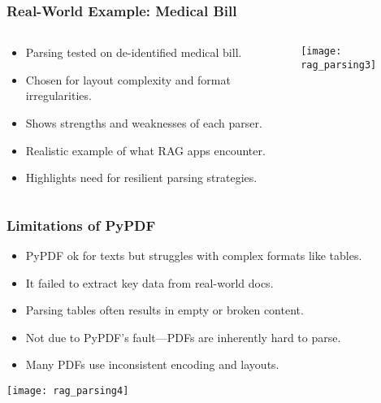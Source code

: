 \begin{frame}[fragile]\frametitle{Real-World Example: Medical Bill}
\begin{columns}
  \begin{column}[T]{0.6\linewidth}
    \begin{itemize}
      \item Parsing tested on de-identified medical bill.
      \item Chosen for layout complexity and format irregularities.
      \item Shows strengths and weaknesses of each parser.
      \item Realistic example of what RAG apps encounter.
      \item Highlights need for resilient parsing strategies.
    \end{itemize}
  \end{column}
  \begin{column}[T]{0.4\linewidth}
    \begin{center}
      \texttt{[image: rag\_parsing3]}
    \end{center}
  \end{column}
\end{columns}
\end{frame}

\begin{frame}[fragile]\frametitle{Limitations of PyPDF}


  \begin{itemize}
    \item PyPDF ok for texts but struggles with complex formats like tables.
    \item It failed to extract key data from real-world docs.
    \item Parsing tables often results in empty or broken content.
    \item Not due to PyPDF's fault—PDFs are inherently hard to parse.
    \item Many PDFs use inconsistent encoding and layouts.
  \end{itemize}

    \begin{center}
      \texttt{[image: rag\_parsing4]}
    \end{center}

\end{frame}


